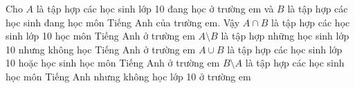 %
\begin{ex}%
	Cho $A$ là tập hợp các học sinh lớp 10 đang học ở trường em và $B$ là tập hợp các học sinh đang học môn Tiếng Anh của trường em. Vậy
	\choiceTF
	{\True $A\cap B$ là tập hợp các học sinh lớp 10 học môn Tiếng Anh ở trường em}
	{\True $A\setminus B$ là tập hợp những học sinh lớp 10 nhưng không học Tiếng Anh ở trường em}
	{\True $A\cup B$ là tập hợp các học sinh lớp 10 hoặc học sinh học môn Tiếng Anh ở trường em}
	{\True $B\setminus A$ là tập hợp các học sinh học môn Tiếng Anh nhưng không học lớp 10 ở trường em}
\end{ex}

